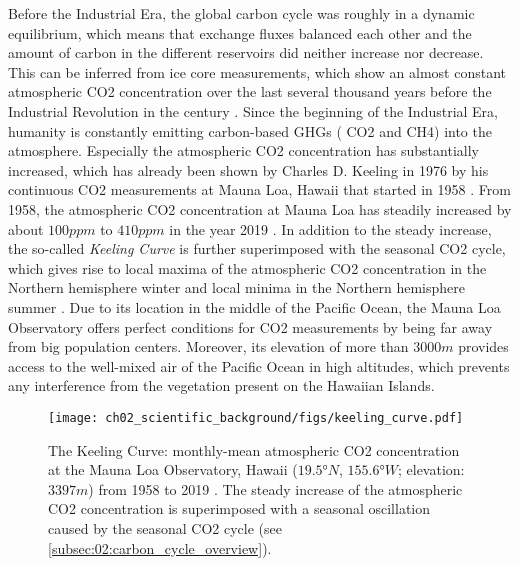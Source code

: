 Before the Industrial Era, the global carbon cycle was roughly in a dynamic
equilibrium, which means that exchange fluxes balanced each other and the
amount of carbon in the different reservoirs did neither increase nor decrease.
This can be inferred from ice core measurements, which show an almost constant
atmospheric \ac{CO2} concentration over the last several thousand years before
the Industrial Revolution in the  century \autocite{Ciais2013}. Since
the beginning of the Industrial Era, humanity is constantly emitting
carbon-based \acp{GHG} (\eg{} \ac{CO2} and \ac{CH4}) into the atmosphere.
Especially the atmospheric \ac{CO2} concentration has substantially increased,
which has already been shown by Charles D. Keeling in 1976 by his continuous
\ac{CO2} measurements at Mauna Loa, Hawaii that started in 1958
. From 1958, the
atmospheric \ac{CO2} concentration at Mauna Loa has steadily increased by about
$100 \unit{ppm}$ to $410 \unit{ppm}$ in the year 2019 \autocite{Keeling2005}.
In addition to the steady increase, the so-called \emph{Keeling Curve} is
further superimposed with the seasonal \ac{CO2} cycle, which gives rise to
local maxima of the atmospheric \ac{CO2} concentration in the Northern
hemisphere winter and local minima in the Northern hemisphere summer
. Due to
its location in the middle of the Pacific Ocean, the Mauna Loa Observatory
offers perfect conditions for \ac{CO2} measurements by being far away from big
population centers. Moreover, its elevation of more than $3000 \unit{m}$
provides access to the well-mixed air of the Pacific Ocean in high altitudes,
which prevents any interference from the vegetation present on the Hawaiian
Islands.

\begin{figure}[t]
  \centering
  \texttt{[image: 
    ch02\_scientific\_background/figs/keeling\_curve.pdf]}
  \caption{The Keeling Curve: monthly-mean atmospheric \acs{CO2} concentration
    at the Mauna Loa Observatory, Hawaii ($19.5 \unit{\degree N}$, $155.6
    \unit{\degree W}$; elevation: $3397 \unit{m}$) from 1958 to 2019
    \autocite{Keeling2005}. The steady increase of the atmospheric \acs{CO2}
    concentration is superimposed with a seasonal oscillation caused by the
    seasonal \acs{CO2} cycle (see \cref{subsec:02:carbon_cycle_overview}).}
  \label{fig:02:keeling_curve}
\end{figure}

